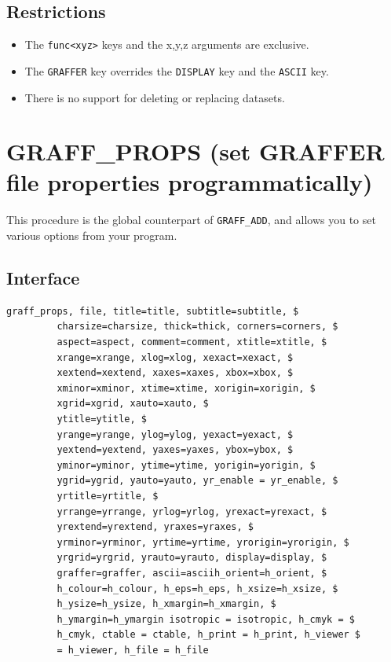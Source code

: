 \documentclass[11pt,twoside,english]{article}
\begin{document}
\subsection{Restrictions}

\begin{itemize}
\item The \texttt{func<xyz>} keys and the x,y,z arguments are
  exclusive.
\item The \texttt{GRAFFER} key overrides the \texttt{DISPLAY} key and
  the \texttt{ASCII} key.
\item There is no support for deleting or replacing datasets.
\end{itemize}


\section{GRAFF\_PROPS (set GRAFFER file properties programmatically)}
\label{sec:graff_props}

This procedure is the global counterpart of \texttt{GRAFF\_ADD}, and
allows you to set various options from your program.\


\subsection{Interface}
\label{sec:gp_interface}

\begin{verbatim}
graff_props, file, title=title, subtitle=subtitle, $
         charsize=charsize, thick=thick, corners=corners, $
         aspect=aspect, comment=comment, xtitle=xtitle, $
         xrange=xrange, xlog=xlog, xexact=xexact, $
         xextend=xextend, xaxes=xaxes, xbox=xbox, $
         xminor=xminor, xtime=xtime, xorigin=xorigin, $
         xgrid=xgrid, xauto=xauto, $
         ytitle=ytitle, $
         yrange=yrange, ylog=ylog, yexact=yexact, $
         yextend=yextend, yaxes=yaxes, ybox=ybox, $
         yminor=yminor, ytime=ytime, yorigin=yorigin, $
         ygrid=ygrid, yauto=yauto, yr_enable = yr_enable, $
         yrtitle=yrtitle, $
         yrrange=yrrange, yrlog=yrlog, yrexact=yrexact, $
         yrextend=yrextend, yraxes=yraxes, $
         yrminor=yrminor, yrtime=yrtime, yrorigin=yrorigin, $
         yrgrid=yrgrid, yrauto=yrauto, display=display, $
         graffer=graffer, ascii=asciih_orient=h_orient, $
         h_colour=h_colour, h_eps=h_eps, h_xsize=h_xsize, $
         h_ysize=h_ysize, h_xmargin=h_xmargin, $
         h_ymargin=h_ymargin isotropic = isotropic, h_cmyk = $
         h_cmyk, ctable = ctable, h_print = h_print, h_viewer $
         = h_viewer, h_file = h_file
\end{verbatim}
\end{document}
